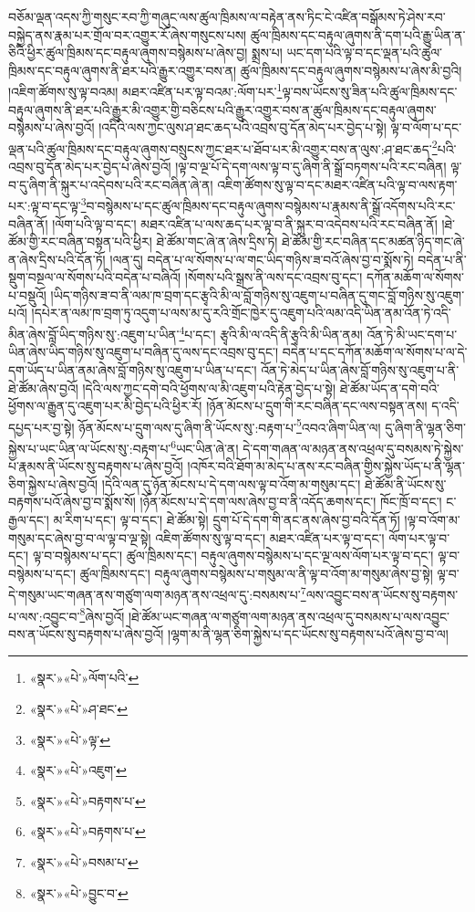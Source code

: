 བཅོམ་ལྡན་འདས་ཀྱི་གསུང་རབ་ཀྱི་གཞུང་ལས་ཚུལ་ཁྲིམས་ལ་བརྟེན་ནས་ཏིང་ངེ་འཛིན་བསྒོམས་ཏེ་ཤེས་རབ་བསྐྱེད་ནས་རྣམ་པར་གྲོལ་བར་འགྱུར་རོ་ཞེས་གསུངས་པས། ཚུལ་ཁྲིམས་དང་བརྟུལ་ཞུགས་ནི་དག་པའི་རྒྱུ་ཡིན་ན་ཅིའི་ཕྱིར་ཚུལ་ཁྲིམས་དང་བརྟུལ་ཞུགས་བསྙེམས་པ་ཞེས་བྱ། སྨྲས་པ། ཡང་དག་པའི་ལྟ་བ་དང་ལྡན་པའི་ཚུལ་ཁྲིམས་དང་བརྟུལ་ཞུགས་ནི་ཐར་པའི་རྒྱུར་འགྱུར་བས་ན། ཚུལ་ཁྲིམས་དང་བརྟུལ་ཞུགས་བསྙེམས་པ་ཞེས་མི་བྱའི། །འཇིག་ཚོགས་སུ་ལྟ་བའམ། མཐར་འཛིན་པར་ལྟ་བའམ་:ལོག་པར་\footnote{«སྣར་»«པེ་»ལོག་པའི་}ལྟ་བས་ཡོངས་སུ་ཟིན་པའི་ཚུལ་ཁྲིམས་དང་བརྟུལ་ཞུགས་ནི་ཐར་པའི་རྒྱུར་མི་འགྱུར་གྱི་བཅིངས་པའི་རྒྱུར་འགྱུར་བས་ན་ཚུལ་ཁྲིམས་དང་བརྟུལ་ཞུགས་བསྙེམས་པ་ཞེས་བྱའོ། །འདིའི་ལས་ཀྱང་ལུས་ཤ་ཐང་ཆད་པའི་འབྲས་བུ་དོན་མེད་པར་བྱེད་པ་སྟེ། ལྟ་བ་ལོག་པ་དང་ལྡན་པའི་ཚུལ་ཁྲིམས་དང་བརྟུལ་ཞུགས་བསྲུངས་ཀྱང་ཐར་པ་ཐོབ་པར་མི་འགྱུར་བས་ན་ལུས་:ཤ་ཐང་ཆད་\footnote{«སྣར་»«པེ་»ཤ་ཐང་}པའི་འབྲས་བུ་དོན་མེད་པར་བྱེད་པ་ཞེས་བྱའོ། །ལྟ་བ་ལྔ་པོ་དེ་དག་ལས་ལྟ་བ་དུ་ཞིག་ནི་སྒྲོ་བཏགས་པའི་རང་བཞིན། ལྟ་བ་དུ་ཞིག་ནི་སྐུར་པ་འདེབས་པའི་རང་བཞིན་ཞེ་ན། འཇིག་ཚོགས་སུ་ལྟ་བ་དང་མཐར་འཛིན་པའི་ལྟ་བ་ལས་རྟག་པར་:ལྟ་བ་དང་ལྟ་\footnote{«སྣར་»«པེ་»ལྟ་}བ་བསྙེམས་པ་དང་ཚུལ་ཁྲིམས་དང་བརྟུལ་ཞུགས་བསྙེམས་པ་རྣམས་ནི་སྒྲོ་འདོགས་པའི་རང་བཞིན་ནོ། །ལོག་པའི་ལྟ་བ་དང་། མཐར་འཛིན་པ་ལས་ཆད་པར་ལྟ་བ་ནི་སྐུར་བ་འདེབས་པའི་རང་བཞིན་ནོ། །ཐེ་ཚོམ་གྱི་རང་བཞིན་བསྟན་པའི་ཕྱིར། ཐེ་ཚོམ་གང་ཞེ་ན་ཞེས་དྲིས་ཏེ། ཐེ་ཚོམ་གྱི་རང་བཞིན་དང་མཚན་ཉིད་གང་ཞེ་ན་ཞེས་དྲིས་པའི་དོན་ཏོ། །ལན་དུ། བདེན་པ་ལ་སོགས་པ་ལ་གང་ཡིད་གཉིས་ཟ་བའོ་ཞེས་བྱ་བ་སྨོས་ཏེ། བདེན་པ་ནི་སྡུག་བསྔལ་ལ་སོགས་པའི་བདེན་པ་བཞིའོ། །སོགས་པའི་སྒྲས་ནི་ལས་དང་འབྲས་བུ་དང་། དཀོན་མཆོག་ལ་སོགས་པ་བསྡུའོ། །ཡིད་གཉིས་ཟ་བ་ནི་ལམ་ཁ་བྲག་དང་རྩྭའི་མི་ལ་བློ་གཉིས་སུ་འཇུག་པ་བཞིན་དུ་གང་བློ་གཉིས་སུ་འཇུག་པའོ། །དཔེར་ན་ལམ་ཁ་བྲག་ཏུ་འདུག་པ་ལས་མ་དུ་རའི་གྲོང་ཁྱེར་དུ་འཇུག་པའི་ལམ་འདི་ཡིན་ནམ་འོན་ཏེ་འདི་མིན་ཞེས་བློ་ཡིད་གཉིས་སུ་:འཇུག་པ་ཡིན་\footnote{«སྣར་»«པེ་»འཇུག་}པ་དང་། རྩྭའི་མི་ལ་འདི་ནི་རྩྭའི་མི་ཡིན་ནམ། འོན་ཏེ་མི་ཡང་དག་པ་ཡིན་ཞེས་ཡིད་གཉིས་སུ་འཇུག་པ་བཞིན་དུ་ལས་དང་འབྲས་བུ་དང་། བདེན་པ་དང་དཀོན་མཆོག་ལ་སོགས་པ་ལ་དེ་དག་ཡོད་པ་ཡིན་ནམ་ཞེས་བློ་གཉིས་སུ་འཇུག་པ་ཡིན་པ་དང་། འོན་ཏེ་མེད་པ་ཡིན་ཞེས་བློ་གཉིས་སུ་འཇུག་པ་ནི་ཐེ་ཚོམ་ཞེས་བྱའོ། །དེའི་ལས་ཀྱང་དགེ་བའི་ཕྱོགས་ལ་མི་འཇུག་པའི་རྟེན་བྱེད་པ་སྟེ། ཐེ་ཚོམ་ཡོད་ན་དགེ་བའི་ཕྱོགས་ལ་རྒྱུན་དུ་འཇུག་པར་མི་བྱེད་པའི་ཕྱིར་རོ། །ཉོན་མོངས་པ་དྲུག་གི་རང་བཞིན་དང་ལས་བསྟན་ནས། ད་འདི་དཔྱད་པར་བྱ་སྟེ། ཉོན་མོངས་པ་དྲུག་ལས་དུ་ཞིག་ནི་ཡོངས་སུ་:བརྟག་པ་\footnote{«སྣར་»«པེ་»བརྟགས་པ་}འབའ་ཞིག་ཡིན་ལ། དུ་ཞིག་ནི་ལྷན་ཅིག་སྐྱེས་པ་ཡང་ཡིན་ལ་ཡོངས་སུ་:བརྟག་པ་\footnote{«སྣར་»«པེ་»བརྟགས་པ་}ཡང་ཡིན་ཞེ་ན། དེ་དག་གཞན་ལ་མཉན་ནས་འཕྲལ་དུ་བསམས་ཏེ་སྐྱེས་པ་རྣམས་ནི་ཡོངས་སུ་བརྟགས་པ་ཞེས་བྱའོ། །འཁོར་བའི་ཐོག་མ་མེད་པ་ནས་རང་བཞིན་གྱིས་སྐྱེས་ཡོད་པ་ནི་ལྷན་ཅིག་སྐྱེས་པ་ཞེས་བྱའོ། །དེའི་ལན་དུ་ཉོན་མོངས་པ་དེ་དག་ལས་ལྟ་བ་འོག་མ་གསུམ་དང་། ཐེ་ཚོམ་ནི་ཡོངས་སུ་བརྟགས་པའོ་ཞེས་བྱ་བ་སྨོས་སོ། །ཉོན་མོངས་པ་དེ་དག་ལས་ཞེས་བྱ་བ་ནི་འདོད་ཆགས་དང་། ཁོང་ཁྲོ་བ་དང་། ང་རྒྱལ་དང་། མ་རིག་པ་དང་། ལྟ་བ་དང་། ཐེ་ཚོམ་སྟེ། དྲུག་པོ་དེ་དག་གི་ནང་ནས་ཞེས་བྱ་བའི་དོན་ཏོ། །ལྟ་བ་འོག་མ་གསུམ་དང་ཞེས་བྱ་བ་ལ་ལྟ་བ་ལྔ་སྟེ། འཇིག་ཚོགས་སུ་ལྟ་བ་དང་། མཐར་འཛིན་པར་ལྟ་བ་དང་། ལོག་པར་ལྟ་བ་དང་། ལྟ་བ་བསྙེམས་པ་དང་། ཚུལ་ཁྲིམས་དང་། བརྟུལ་ཞུགས་བསྙེམས་པ་དང་ལྔ་ལས་ལོག་པར་ལྟ་བ་དང་། ལྟ་བ་བསྙེམས་པ་དང་། ཚུལ་ཁྲིམས་དང་། བརྟུལ་ཞུགས་བསྙེམས་པ་གསུམ་ལ་ནི་ལྟ་བ་འོག་མ་གསུམ་ཞེས་བྱ་སྟེ། ལྟ་བ་དེ་གསུམ་ཡང་གཞན་ནས་གཙུག་ལག་མཉན་ནས་འཕྲལ་དུ་:བསམས་པ་\footnote{«སྣར་»«པེ་»བསམ་པ་}ལས་འབྱུང་བས་ན་ཡོངས་སུ་བརྟགས་པ་ལས་:འབྱུང་བ་\footnote{«སྣར་»«པེ་»བྱུང་བ་}ཞེས་བྱའོ། །ཐེ་ཚོམ་ཡང་གཞན་ལ་གཙུག་ལག་མཉན་ནས་འཕྲལ་དུ་བསམས་པ་ལས་འབྱུང་བས་ན་ཡོངས་སུ་བརྟགས་པ་ཞེས་བྱའོ། །ལྷག་མ་ནི་ལྷན་ཅིག་སྐྱེས་པ་དང་ཡོངས་སུ་བརྟགས་པའོ་ཞེས་བྱ་བ་ལ། 